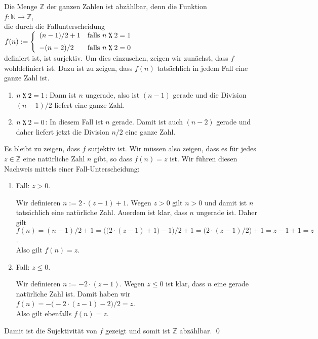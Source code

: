 \example
Die Menge $\mathbb{Z}$ der ganzen Zahlen ist abz\"{a}hlbar, denn die Funktion
\\[0.2cm]
\hspace*{1.3cm}
$f: \mathbb{N} \rightarrow \mathbb{Z}$,
\\[0.2cm]
die durch die Fallunterscheidung
\\[0.2cm]
\hspace*{1.3cm}
$f(n) := \left\{ \begin{array}[c]{ll}
                 (n - 1) / 2 + 1  & \mbox{falls $n \;\texttt{\%}\; 2 = 1$}  \\[0.2cm]
                 - (n - 2) / 2          & \mbox{falls $n \;\texttt{\%}\; 2 = 0$}
                 \end{array}
         \right.
$ 
\\[0.2cm]
definiert ist, ist surjektiv.  Um dies einzusehen, zeigen wir zun\"{a}chst, dass $f$ wohldefiniert ist.
Dazu ist zu zeigen, dass $f(n)$ tats\"{a}chlich in jedem Fall eine ganze Zahl ist.
\begin{enumerate}
\item $n \;\texttt{\%}\; 2 = 1$:  Dann ist $n$ ungerade, also ist $(n-1)$ gerade und die Division
      $(n-1)/2$ liefert eine ganze Zahl.
\item $n \;\texttt{\%}\; 2 = 0$:  In diesem Fall ist $n$ gerade.  Damit ist auch $(n-2)$ gerade und daher
      liefert jetzt die Division $n/2$ eine ganze Zahl.
\end{enumerate}
Es bleibt zu zeigen, dass $f$ surjektiv ist.  Wir m\"{u}ssen also zeigen, dass es f\"{u}r jedes 
$z \in \mathbb{Z}$ eine nat\"{u}rliche Zahl $n$ gibt, so dass $f(n) = z$ ist.  Wir f\"{u}hren diesen Nachweis
mittels einer Fall-Unterscheidung:
\begin{enumerate}
\item Fall: $z > 0$.
  
      Wir definieren $n := 2 \cdot (z - 1) + 1$.  Wegen $z >0$ gilt $n > 0$ und damit ist $n$
      tats\"{a}chlich eine nat\"{u}rliche Zahl.  Au\3erdem ist klar, dass $n$ ungerade ist. Daher gilt
      \\[0.2cm]
      \hspace*{0.3cm}
      $f(n) = (n - 1)/2 + 1 = \bigl(\bigl(2 \cdot (z - 1) + 1\bigr) - 1\bigr)/2 + 1 
            = \bigl(2 \cdot (z - 1)/2\bigr) + 1= z-1 + 1 = z
      $.
      \\[0.2cm]
      Also gilt $f(n) = z$.
\item Fall: $z \leq 0$.

      Wir definieren $n := - 2 \cdot (z - 1)$.  Wegen $z \leq 0$ ist klar, dass $n$ eine gerade 
      nat\"{u}rliche Zahl ist.  Damit haben wir
      \\[0.2cm]
      \hspace*{1.3cm}
      $f(n) = -\bigl(-2 \cdot (z - 1) - 2\bigr)/2 = z$.
      \\[0.2cm]
      Also gilt ebenfalls $f(n) = z$.
\end{enumerate}
Damit ist die Sujektivit\"{a}t von $f$ gezeigt und somit ist $\mathbb{Z}$ abz\"{a}hlbar.
\qed

